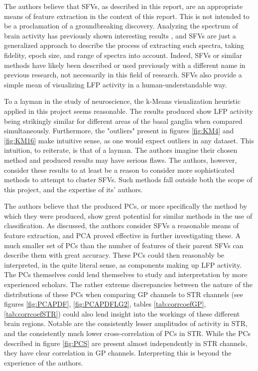 \documentclass{article}
\begin{document}
The authors believe that SFVs, as described in this report, are an appropriate means of feature extraction in the context of this report. 
This is not intended to be a proclamation of a groundbreaking discovery.
Analyzing the spectrum of brain activity has previously shown interesting results \citep{Cagnan}, and SFVs are just a generalized approach to describe the process of extracting such spectra, taking fidelity, epoch size, and range of spectra into account.
Indeed, SFVs or similar methods have likely been described or used previously with a different name in previous research, not necessarily in this field of research.
SFVs also provide a simple mean of visualizing LFP activity in a human-understandable way.

To a layman in the study of neuroscience, the k-Means visualization heuristic applied in this project seems reasonable.
The results produced show LFP activity being strikingly similar for different areas of the basal ganglia when compared simultaneously.
Furthermore, the "outliers" present in figures \ref{fig:KM4} and \ref{fig:KM16} make intuitive sense, as one would expect outliers in any dataset.
This intuition, to reiterate, is that of a layman.
The authors imagine their chosen method and produced results may have serious flaws.
The authors, however, consider these results to at least be a reason to consider more sophisticated methods to attempt to cluster SFVs.
Such methods fall outside both the scope of this project, and the expertise of its' authors.

The authors believe that the produced PCs, or more specifically the method by which they were produced, show great potential for similar methods in the use of classification.
As discussed, the authors consider SFVs a reasonable means of feature extraction, and PCA proved effective in further investigating these.
A much smaller set of PCs than the number of features of their parent SFVs can describe them with great accuracy.
These PCs could then reasonably be interpreted, in the quite literal sense, as components making up LFP activity.
The PCs themselves could lend themselves to study and interpretation by more experienced scholars.
The rather extreme discrepancies between the nature of the distributions of these PCs when comparing GP channels to STR channels (see figures \ref{fig:PCAPDF}, \ref{fig:PCAPDFLG2}, tables \ref{tab:corrcoefGP}, \ref{tab:corrcoefSTR}) could also lend insight into the workings of these different brain regions.
Notable are the consistently lesser amplitudes of activity in STR, and the consistently much lower cross-correlation of PCs in STR.
While the PCs described in figure \ref{fig:PCS} are present almost independently in STR channels, they have clear correlation in GP channels.
Interpreting this is beyond the experience of the authors.
\end{document}
